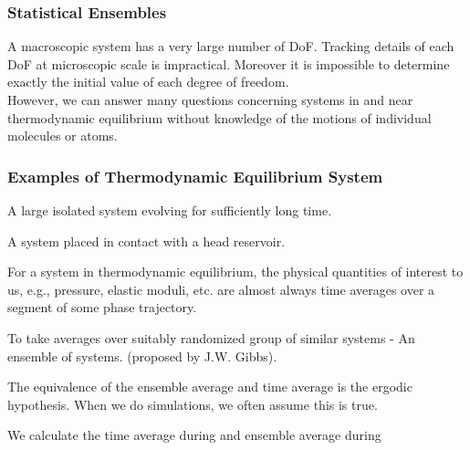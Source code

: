 \documentclass[../main/main.tex]{subfiles}
\begin{document}
\subsubsection*{Statistical Ensembles}
A macroscopic system has a very large number of DoF. Tracking details of each DoF at microscopic scale is impractical. Moreover it is impossible to determine exactly the initial value of each degree of freedom.\\

However, we can answer many questions concerning systems in and near thermodynamic equilibrium without knowledge of the motions of individual molecules or atoms.


\subsubsection*{Examples of Thermodynamic Equilibrium System}

\begin{example}
	A large isolated system evolving for sufficiently long time.
\end{example}
\begin{example}
	A system placed in contact with a head reservoir.
\end{example}

\begin{definition}
	For a system in thermodynamic equilibrium, the physical quantities of interest to us, e.g., pressure, elastic moduli, etc. are almost always time averages over a segment of some phase trajectory.
\end{definition}
\begin{definition}
	To take averages over suitably randomized group of similar systems - An ensemble of systems. (proposed by J.W. Gibbs).
\end{definition}

The equivalence of the ensemble average and time average is the ergodic hypothesis. When we do simulations, we often assume this is true.

We calculate the time average during  and ensemble average during 
\end{document}
